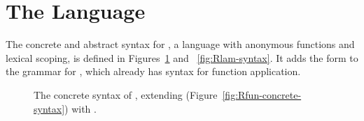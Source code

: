 \documentclass[11pt]{book}
\newcommand{\gray}[1]{{\color{gray} #1}}
\begin{document}
\section{The \LangLam{} Language}
\label{sec:r5}

The concrete and abstract syntax for \LangLam{}, a language with anonymous
functions and lexical scoping, is defined in
Figures~\ref{fig:Rlam-concrete-syntax} and ~\ref{fig:Rlam-syntax}. It adds
the  form to the grammar for \LangFun{}, which already has
syntax for function application.

\begin{figure}[tp]
\centering
\fbox{
  \begin{minipage}{0.96\textwidth}
    \small
\[
\begin{array}{lcl}
  \Type &::=& \gray{\key{Integer} \mid \key{Boolean}
     \mid (\key{Vector}\;\Type\ldots) \mid \key{Void}
     \mid (\Type\ldots \; \key{->}\; \Type)} \\
  \Exp &::=& \gray{ \Int \mid \CREAD{} \mid \CNEG{\Exp}
     \mid \CADD{\Exp}{\Exp} \mid \CSUB{\Exp}{\Exp} }  \\
    &\mid&  \gray{ \Var \mid \CLET{\Var}{\Exp}{\Exp} }\\
    &\mid& \gray{\key{\#t} \mid \key{\#f} 
     \mid (\key{and}\;\Exp\;\Exp) 
     \mid (\key{or}\;\Exp\;\Exp) 
     \mid (\key{not}\;\Exp) } \\
    &\mid& \gray{ (\key{eq?}\;\Exp\;\Exp) \mid \CIF{\Exp}{\Exp}{\Exp} } \\
    &\mid& \gray{ (\key{vector}\;\Exp\ldots) \mid
          (\key{vector-ref}\;\Exp\;\Int)} \\
    &\mid& \gray{(\key{vector-set!}\;\Exp\;\Int\;\Exp)\mid (\key{void})
    \mid (\Exp \; \Exp\ldots) } \\
    &\mid& \LP \key{procedure-arity}~\Exp\RP \\
    &\mid& \CLAMBDA{\LP\LS\Var \key{:} \Type\RS\ldots\RP}{\Type}{\Exp} \\
  \Def &::=& \gray{ \CDEF{\Var}{\LS\Var \key{:} \Type\RS\ldots}{\Type}{\Exp} } \\
  \LangLam{} &::=& \gray{\Def\ldots \; \Exp}
\end{array}
\]
\end{minipage}
}
\caption{The concrete syntax of \LangLam{}, extending \LangFun{} (Figure~\ref{fig:Rfun-concrete-syntax}) 
  with .}
\label{fig:Rlam-concrete-syntax}
\end{figure}
\end{document}
